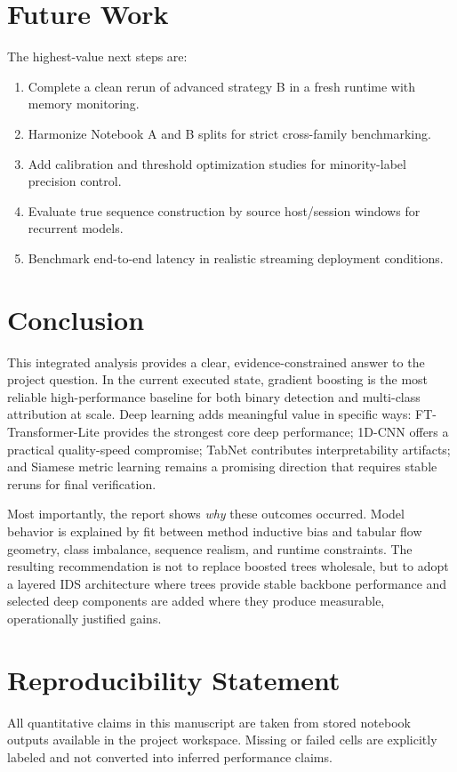 \documentclass[10pt,journal]{IEEEtran}
\begin{document}
\section{Future Work}
The highest-value next steps are:

\begin{enumerate}
\item Complete a clean rerun of advanced strategy B in a fresh runtime with memory monitoring.
\item Harmonize Notebook A and B splits for strict cross-family benchmarking.
\item Add calibration and threshold optimization studies for minority-label precision control.
\item Evaluate true sequence construction by source host/session windows for recurrent models.
\item Benchmark end-to-end latency in realistic streaming deployment conditions.
\end{enumerate}

\section{Conclusion}
This integrated analysis provides a clear, evidence-constrained answer to the project question. In the current executed state, gradient boosting is the most reliable high-performance baseline for both binary detection and multi-class attribution at scale. Deep learning adds meaningful value in specific ways: FT-Transformer-Lite provides the strongest core deep performance; 1D-CNN offers a practical quality-speed compromise; TabNet contributes interpretability artifacts; and Siamese metric learning remains a promising direction that requires stable reruns for final verification.

Most importantly, the report shows \emph{why} these outcomes occurred. Model behavior is explained by fit between method inductive bias and tabular flow geometry, class imbalance, sequence realism, and runtime constraints. The resulting recommendation is not to replace boosted trees wholesale, but to adopt a layered IDS architecture where trees provide stable backbone performance and selected deep components are added where they produce measurable, operationally justified gains.

\section*{Reproducibility Statement}
All quantitative claims in this manuscript are taken from stored notebook outputs available in the project workspace. Missing or failed cells are explicitly labeled and not converted into inferred performance claims.



\end{document}
